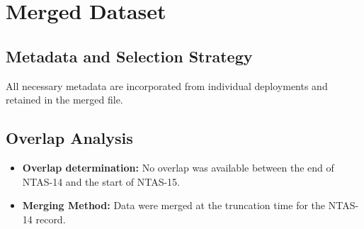 \section{Merged Dataset}
\subsection{Metadata and Selection Strategy}
All necessary metadata are incorporated from individual deployments and retained in the merged file.

\subsection{Overlap Analysis}
\begin{itemize}
	\item \textbf{Overlap determination:} No overlap was available between the end of NTAS-14 and the start of NTAS-15.
	\item \textbf{Merging Method:} Data were merged at the truncation time for the NTAS-14 record.
\end{itemize}

